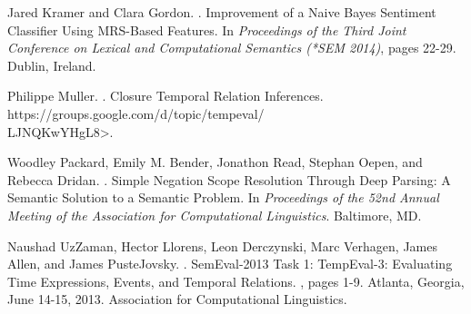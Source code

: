 \documentclass[11pt]{article}
\begin{document}
\begin{thebibliography}{}
Jared Kramer and Clara Gordon.
.
\newblock Improvement of a Naive Bayes Sentiment Classifier Using MRS-Based Features.
\newblock In {\em Proceedings of the Third Joint Conference on Lexical and Computational Semantics (*SEM 2014)}, pages 22-29.
\newblock Dublin, Ireland.

Philippe Muller.
.
\newblock Closure Temporal Relation Inferences.
\newblock {\textless}https://groups.google.com/d/topic/tempeval/\\LJNQKwYHgL8{\textgreater}.

Woodley Packard, Emily M. Bender, Jonathon Read, Stephan Oepen, and Rebecca Dridan.
.
\newblock Simple Negation Scope Resolution Through Deep Parsing: A Semantic Solution to a Semantic Problem.
\newblock In {\em Proceedings of the 52nd Annual Meeting of the Association for Computational Linguistics}.
\newblock Baltimore, MD.

Naushad UzZaman, Hector Llorens, Leon Derczynski, Marc Verhagen, James Allen, and James PusteJovsky.
.
\newblock SemEval-2013 Task 1: TempEval-3: Evaluating Time Expressions, Events, and Temporal Relations.
, pages 1-9.
\newblock Atlanta, Georgia, June 14-15, 2013.
\newblock Association for Computational Linguistics.

\end{thebibliography}
\end{document}

